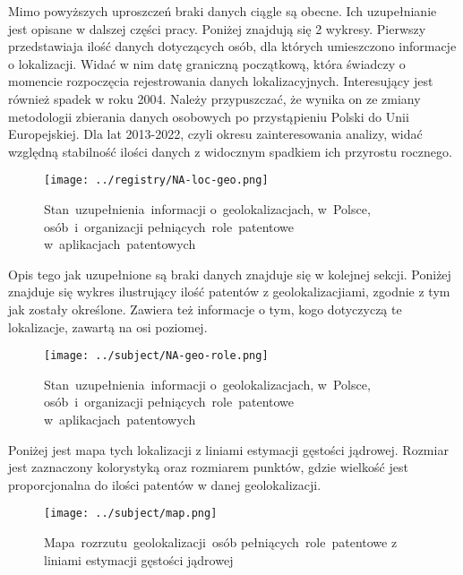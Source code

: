 Mimo powyższych uproszczeń braki danych ciągle są obecne. Ich uzupełnianie
jest opisane w dalszej części pracy. Poniżej znajdują się 2 wykresy. 
Pierwszy przedstawiaja ilość danych dotyczących osób, dla których 
umieszczono informacje o lokalizacji. Widać w nim datę graniczną początkową,
która świadczy o momencie rozpoczęcia rejestrowania danych lokalizacyjnych.
Interesujący jest również spadek w roku 2004. Należy przypuszczać, że wynika
on ze zmiany metodologii zbierania danych osobowych po przystąpieniu
Polski do Unii Europejskiej.
Dla lat 2013-2022, czyli okresu zainteresowania analizy,
widać względną stabilność ilości danych z widocznym
spadkiem ich przyrostu rocznego. 



\begin{figure}[H]\centering
\texttt{[image: ../registry/NA-loc-geo.png]}
\caption{Stan~uzupełnienia~informacji
         o~geolokalizacjach,
         w~Polsce,
         osób~i~organizacji 
         pełniących~role~patentowe 
         w~aplikacjach~patentowych}
\srcuprp
\end{figure}



Opis tego jak uzupełnione są braki danych znajduje się w kolejnej sekcji.
Poniżej znajduje się wykres ilustrujący ilość patentów z geolokalizacjiami,
zgodnie z tym jak zostały określone. Zawiera też informacje o tym, kogo
dotyczyczą te lokalizacje, zawartą na osi poziomej.

\begin{figure}[H]\centering
\texttt{[image: ../subject/NA-geo-role.png]}
\caption{Stan~uzupełnienia~informacji
         o~geolokalizacjach,
         w~Polsce,
         osób~i~organizacji 
         pełniących~role~patentowe 
         w~aplikacjach~patentowych}
\srcuprp
\end{figure}

Poniżej jest mapa tych lokalizacji z liniami 
estymacji gęstości jądrowej. Rozmiar jest zaznaczony kolorystyką 
oraz rozmiarem punktów, gdzie wielkość jest proporcjonalna 
do ilości patentów w danej geolokalizacji.

\begin{figure}[H]\centering
\texttt{[image: ../subject/map.png]}
\caption{Mapa~rozrzutu~geolokalizacji~osób
         pełniących~role~patentowe
         z liniami estymacji gęstości jądrowej}
\srcuprp
\end{figure}

